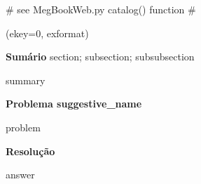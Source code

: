 {# see MegBookWeb.py catalog() function #}


\bigskip

  (ekey=0, {{exformat}})

\textbf{Sumário} {{section}}; {{subsection}}; {{subsubsection}}

\begin{spverbatim}
{{summary}}
\end{spverbatim}

\textbf{Problema {{suggestive_name}}  }

{{problem}}

\textbf{Resolução}

{{answer}}




